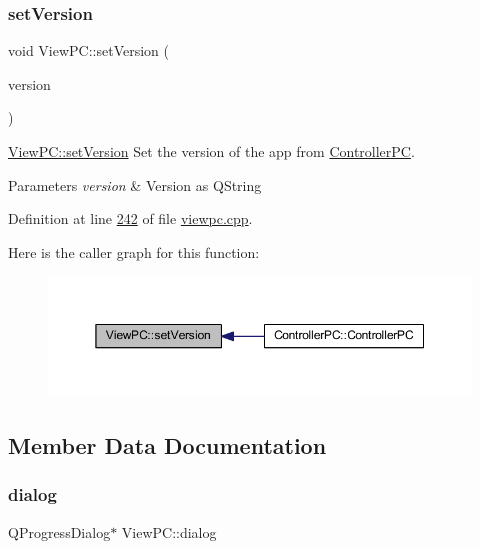 \subsubsection{\texorpdfstring{set\+Version}{setVersion}}
{\footnotesize\ttfamily void View\+P\+C\+::set\+Version (\begin{DoxyParamCaption}\item[{Q\+String}]{version }\end{DoxyParamCaption})\hspace{0.3cm}{\ttfamily [slot]}}



\mbox{\hyperlink{class_view_p_c_ac05220df875b7c4f24405a5742476ebf}{View\+P\+C\+::set\+Version}} Set the version of the app from \mbox{\hyperlink{class_controller_p_c}{Controller\+PC}}. 


\begin{DoxyParams}{Parameters}
{\em version} & Version as Q\+String \\
\hline
\end{DoxyParams}


Definition at line \mbox{\hyperlink{viewpc_8cpp_source_l00242}{242}} of file \mbox{\hyperlink{viewpc_8cpp_source}{viewpc.\+cpp}}.

Here is the caller graph for this function\+:
\nopagebreak
\begin{figure}[H]
\begin{center}
\leavevmode
\includegraphics[width=350pt]{class_view_p_c_ac05220df875b7c4f24405a5742476ebf_icgraph}
\end{center}
\end{figure}


\subsection{Member Data Documentation}
\mbox{\label{class_view_p_c_a31abbb470fe329b44e6ffee202b903ca}} 
\subsubsection{\texorpdfstring{dialog}{dialog}}
{\footnotesize\ttfamily Q\+Progress\+Dialog$\ast$ View\+P\+C\+::dialog}



